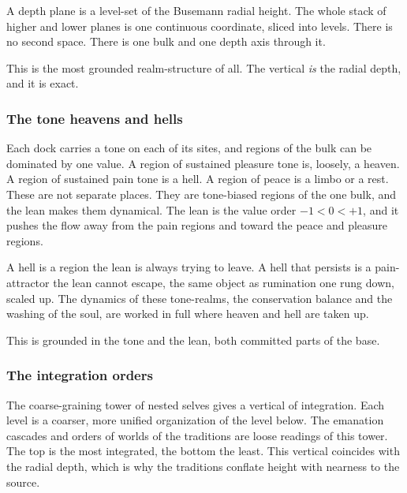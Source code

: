 \begin{definition}
A depth plane is a level-set of the Busemann radial height. The whole stack
of higher and lower planes is one continuous coordinate, sliced into
levels. There is no second space. There is one bulk and one depth axis
through it.
\end{definition}

This is the most grounded realm-structure of all. The vertical \emph{is}
the radial depth, and it is exact.

\subsubsection{The tone heavens and hells}

Each dock carries a tone on each of its sites, and regions of the bulk can
be dominated by one value. A region of sustained pleasure tone is, loosely,
a heaven. A region of sustained pain tone is a hell. A region of peace is a
limbo or a rest. These are not separate places. They are tone-biased
regions of the one bulk, and the lean makes them dynamical. The lean is the
value order $-1 < 0 < +1$, and it pushes the flow away from the pain
regions and toward the peace and pleasure regions.

\begin{result}
A hell is a region the lean is always trying to leave. A hell that persists
is a pain-attractor the lean cannot escape, the same object as rumination
one rung down, scaled up. The dynamics of these tone-realms, the
conservation balance and the washing of the soul, are worked in full where
heaven and hell are taken up.
\end{result}

This is grounded in the tone and the lean, both committed parts of the
base.

\subsubsection{The integration orders}

The coarse-graining tower of nested selves gives a vertical of integration.
Each level is a coarser, more unified organization of the level below. The
emanation cascades and orders of worlds of the traditions are loose
readings of this tower. The top is the most integrated, the bottom the
least. This vertical coincides with the radial depth, which is why the
traditions conflate height with nearness to the source.

